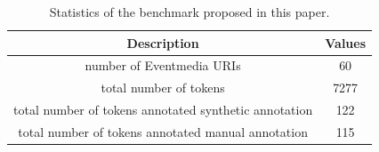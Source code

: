 \documentclass[10pt,a4paper]{article}
\begin{document}
\begin{table}[h]
\centering %
\begin{tabular}{c c } %
\hline %
Description & Values \\ [0.5ex] %
\hline\hline %
number of Eventmedia URIs & 60  \\
total number of tokens & 7277  \\
total number of tokens annotated synthetic annotation & 122  \\
total number of tokens annotated manual annotation & 115  \\
\hline %
\end{tabular}
\caption{Statistics of the benchmark proposed in this paper.} %
\label{tab:benchmark} %
\end{table}
\end{document}
